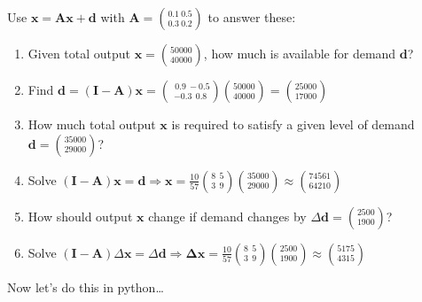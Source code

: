 \documentclass[dvips, %
               xcolor=pst,
               hyperref={colorlinks=false,
               dvips,
               citecolor=magenta,menucolor=cyan,
               bookmarks,bookmarksopen,pdfpagemode=UseThumbs}
              ]{beamer}
\renewcommand{\red}{}
\begin{document}
\begin{frame}[fragile]\frametitle{}
Use $\boldsymbol{x} = \boldsymbol{A}\boldsymbol{x}+\boldsymbol{d}$ with
$\boldsymbol{A}={0.1\ 0.5\choose 0.3\ 0.2}$ to answer these:

\bigskip

\begin{enumerate}[<+->]

\item
Given total output $\boldsymbol{x}={50000\choose 40000}$, how much is available for demand $\boldsymbol{d}$?

\item[\ ]{\red Find  $\boldsymbol{d} = (\boldsymbol{I}-\boldsymbol{A})\boldsymbol{x} =
{\ \ 0.9\ -0.5\choose -0.3\ \ 0.8}{50000\choose 40000} = {25000 \choose 17000}$}

\item
How much total output $\boldsymbol{x}$ is required to satisfy a given level of
demand $\boldsymbol{d} = {35000\choose 29000}$?

\item[\ ]{\red Solve  $(\boldsymbol{I}-\boldsymbol{A})\boldsymbol{x} = \boldsymbol{d}
\Longrightarrow
\boldsymbol{x} = \frac{10}{57}{8\ \ 5 \choose 3\ \ 9}{35000\choose 29000}
\approx { 74561 \choose 64210}$}

\item
How should output $\boldsymbol{x}$ change if demand changes by $\Delta\boldsymbol{d}= {2500\choose 1900}$?

\item[\ ]{\red Solve  $(\boldsymbol{I}-\boldsymbol{A})\Delta\boldsymbol{x} = \Delta\boldsymbol{d}
\Longrightarrow
\boldsymbol{\Delta x} = \frac{10}{57}{8\ \ 5 \choose 3\ \ 9}{2500\choose 1900}
\approx { 5175 \choose 4315}$}

\end{enumerate}

\bigskip

Now let's do this in python\ldots

\end{frame}
\end{document}
